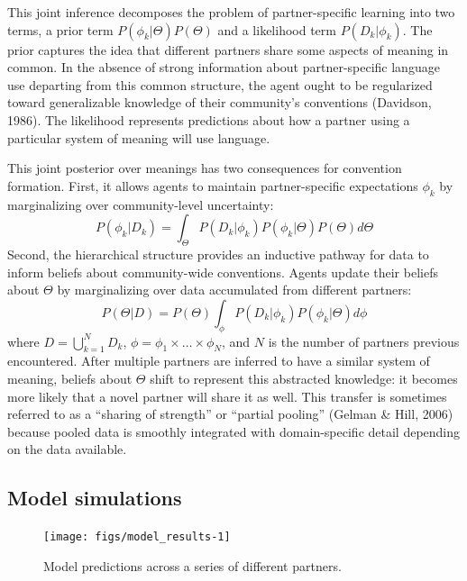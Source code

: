 \documentclass[10pt, letterpaper]{article}
\newenvironment{CodeChunk}{}{}
\begin{document}
This joint inference decomposes the problem of partner-specific learning
into two terms, a prior term \(P(\phi_k | \Theta)P(\Theta)\) and a
likelihood term \(P(D_k | \phi_k)\). The prior captures the idea that
different partners share some aspects of meaning in common. In the
absence of strong information about partner-specific language use
departing from this common structure, the agent ought to be regularized
toward generalizable knowledge of their community's conventions
(Davidson, 1986). The likelihood represents predictions about how a
partner using a particular system of meaning will use language.

This joint posterior over meanings has two consequences for convention
formation. First, it allows agents to maintain partner-specific
expectations \(\phi_k\) by marginalizing over community-level
uncertainty: \begin{equation}
P(\phi_k | D_k) = \int_{\Theta}P(D_k | \phi_k) P(\phi_k | \Theta) P(\Theta)  d\Theta
\end{equation} Second, the hierarchical structure provides an inductive
pathway for data to inform beliefs about community-wide conventions.
Agents update their beliefs about \(\Theta\) by marginalizing over data
accumulated from different partners: \begin{equation}
P(\Theta | D) = P(\Theta) \int_{\phi} P(D_k | \phi_k) P(\phi_k | \Theta) d\phi
\end{equation} where \(D = \bigcup_{k=1}^N D_k\),
\(\phi = \phi_1 \times \dots \times \phi_N\), and \(N\) is the number of
partners previous encountered. After multiple partners are inferred to
have a similar system of meaning, beliefs about \(\Theta\) shift to
represent this abstracted knowledge: it becomes more likely that a novel
partner will share it as well. This transfer is sometimes referred to as
a ``sharing of strength'' or ``partial pooling'' (Gelman \& Hill, 2006)
because pooled data is smoothly integrated with domain-specific detail
depending on the data available.

\hypertarget{model-simulations}{%
\subsection{Model simulations}\label{model-simulations}}

\begin{CodeChunk}
\begin{figure}[t!]

{\centering \texttt{[image: figs/model\_results-1]} 

}

\caption{\label{fig:simulations} Model predictions across a series of different partners.}\label{fig:model_results}
\end{figure}
\end{CodeChunk}
\end{document}
